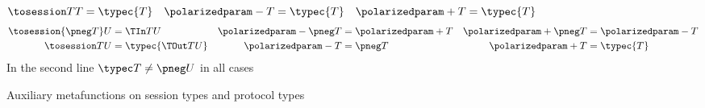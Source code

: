 \begin{figure}[t!]
{$\tosession TT = \typec{T} \quad 
  \polarizedparam - T = \typec{T} \quad
  \polarizedparam + T = \typec{T}$}
%
\begin{align*}
  \tosession {\pneg T} U &= \TIn TU & 
  \polarizedparam - {\pneg T} &= \polarizedparam + T &
  \polarizedparam + {\pneg T} &= \polarizedparam - T
  \\
  \tosession TU &= \typec{\TOut TU} & 
  \polarizedparam - T &= \pneg T &
  \polarizedparam + T &= \typec{T}
\end{align*}
In the second line $\typec T \neq \pneg U$ in all cases
\caption{Auxiliary metafunctions on session types and protocol types}
\label{fig:type-polarized-operator}
\end{figure}


